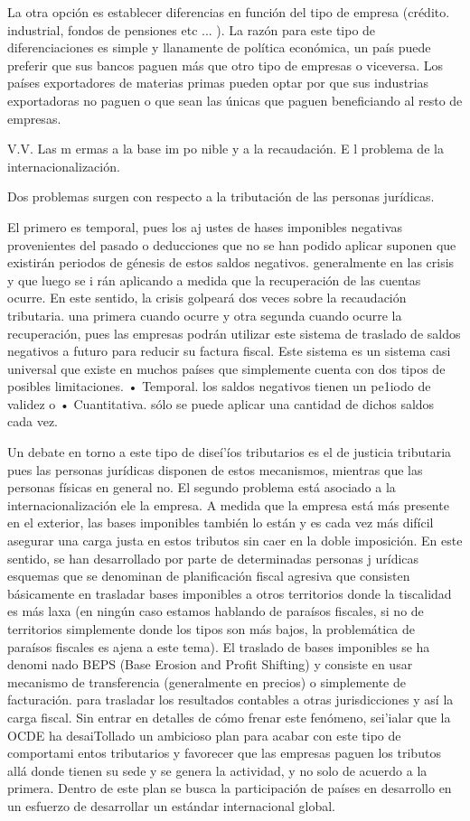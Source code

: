 \documentclass[10pt,a4paper]{article}
\begin{document}
La otra opción es establecer diferencias en función del tipo de empresa (crédito. industrial, fondos de pensiones etc ... ). La razón para este tipo de diferenciaciones es simple y llanamente de política económica, un país puede preferir que sus bancos paguen más que otro tipo de empresas o viceversa. Los países exportadores de materias primas pueden optar por que sus industrias exportadoras no paguen o que sean las únicas que paguen beneficiando al resto de empresas.



V.V. Las m ermas a la base im po nible y a la recaudación. E l problema de la internacionalización.

Dos problemas surgen con respecto a la tributación de las personas jurídicas.

El primero es temporal, pues los aj ustes de hases imponibles negativas provenientes del pasado o deducciones que no se han podido aplicar suponen que existirán periodos de génesis de estos saldos negativos. generalmente en las crisis y que luego se i rán aplicando a medida que la recuperación de las cuentas ocurre. En este sentido, la crisis golpeará dos veces sobre la recaudación tributaria. una primera cuando ocurre y otra segunda cuando ocurre la recuperación, pues las empresas podrán utilizar este sistema de traslado de saldos negativos a futuro para reducir su factura fiscal. Este sistema es un sistema casi universal que existe en muchos países que simplemente cuenta con dos tipos de posibles limitaciones.
• Temporal. los saldos negativos tienen un pe1iodo de validez o
• Cuantitativa. sólo se puede aplicar una cantidad de dichos saldos cada vez.

Un debate en torno a este tipo de diseí'íos tributarios es el de justicia tributaria pues las personas jurídicas disponen de estos mecanismos, mientras que las personas físicas en general no. El segundo problema está asociado a la internacionalización ele la empresa. A medida que la empresa está más presente en el exterior, las bases imponibles también lo están y es cada vez más difícil asegurar una carga justa en estos tributos sin caer en la doble imposición. En este sentido, se han desarrollado por parte de determinadas personas j urídicas esquemas que se denominan de planificación fiscal agresiva que consisten básicamente en trasladar bases imponibles a otros territorios donde la tiscalidad es más laxa (en ningún caso estamos hablando de paraísos fiscales, si no de territorios simplemente donde los tipos son más bajos, la problemática de paraísos fiscales es ajena a este tema). El traslado de bases imponibles se ha denomi nado BEPS (Base Erosion and Profit Shifting) y consiste en usar mecanismo de transferencia (generalmente en precios) o simplemente de facturación. para trasladar los resultados contables a otras jurisdicciones y así la carga fiscal. Sin entrar en detalles de cómo frenar este fenómeno, sei'ialar que la OCDE ha desaiTollado un ambicioso plan para acabar con este tipo de comportami entos tributarios y favorecer que las empresas paguen los tributos allá donde tienen su sede y se genera la actividad, y no solo de acuerdo a la primera. Dentro de este plan se busca la participación de países en desarrollo en un esfuerzo de desarrollar un estándar internacional global.
\end{document}
